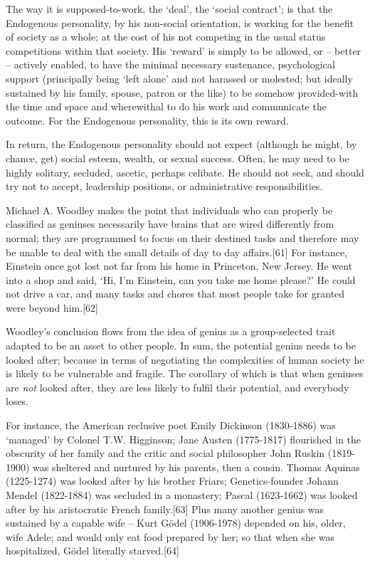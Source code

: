 \documentclass[
]{book}
\begin{document}
The way it is supposed-to-work, the `deal', the `social contract'; is that the Endogenous personality, by his non-social orientation, is working for the benefit of society as a whole; at the cost of his not competing in the usual status competitions within that society. His `reward' is simply to be allowed, or -- better -- actively enabled, to have the minimal necessary sustenance, psychological support (principally being `left alone' and not harassed or molested; but ideally sustained by his family, spouse, patron or the like) to be somehow provided-with the time and space and wherewithal to do his work and communicate the outcome. For the Endogenous personality, this is its own reward.

In return, the Endogenous personality should not expect (although he might, by chance, get) social esteem, wealth, or sexual success. Often, he may need to be highly solitary, secluded, ascetic, perhaps celibate. He should not seek, and should try not to accept, leadership positions, or administrative responsibilities.

Michael A. Woodley makes the point that individuals who can properly be classified as geniuses necessarily have brains that are wired differently from normal; they are programmed to focus on their destined tasks and therefore may be unable to deal with the small details of day to day affairs.{[}61{]} For instance, Einstein once got lost not far from his home in Princeton, New Jersey. He went into a shop and said, `Hi, I'm Einstein, can you take me home please?' He could not drive a car, and many tasks and chores that most people take for granted were beyond him.{[}62{]}

Woodley's conclusion flows from the idea of genius as a group-selected trait adapted to be an asset to other people. In sum, the potential genius needs to be looked after; because in terms of negotiating the complexities of human society he is likely to be vulnerable and fragile. The corollary of which is that when geniuses are \emph{not} looked after, they are less likely to fulfil their potential, and everybody loses.

For instance, the American reclusive poet Emily Dickinson (1830-1886) was `managed' by Colonel T.W. Higginson; Jane Austen (1775-1817) flourished in the obscurity of her family and the critic and social philosopher John Ruskin (1819-1900) was sheltered and nurtured by his parents, then a cousin. Thomas Aquinas (1225-1274) was looked after by his brother Friars; Genetics-founder Johann Mendel (1822-1884) was secluded in a monastery; Pascal (1623-1662) was looked after by his aristocratic French family.{[}63{]} Plus many another genius was sustained by a capable wife -- Kurt Gödel (1906-1978) depended on his, older, wife Adele; and would only eat food prepared by her; so that when she was hospitalized, Gödel literally starved.{[}64{]}
\end{document}
